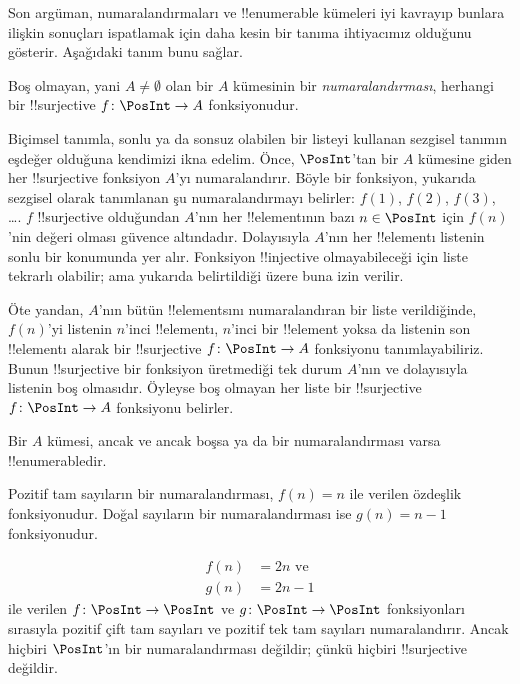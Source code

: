 Son argüman, numaralandırmaları ve !!{enumerable} kümeleri iyi kavrayıp
bunlara ilişkin sonuçları ispatlamak için daha kesin bir tanıma ihtiyacımız
olduğunu gösterir. Aşağıdaki tanım bunu sağlar.

\begin{defn}
Boş olmayan, yani $A\neq\emptyset$ olan bir $A$ kümesinin bir
\emph{numaralandırması}, herhangi bir
!!{surjective} $f \colon \PosInt \to A$ fonksiyonudur.
\end{defn}

\begin{explain}
Biçimsel tanımla, sonlu ya da sonsuz olabilen bir listeyi kullanan sezgisel
tanımın eşdeğer olduğuna kendimizi ikna edelim. Önce, $\PosInt$'tan bir $A$
kümesine giden her !!{surjective} fonksiyon $A$'yı numaralandırır. Böyle bir
fonksiyon, yukarıda sezgisel olarak tanımlanan şu numaralandırmayı belirler:
$f(1)$, $f(2)$, $f(3)$, \dots. $f$ !!{surjective} olduğundan $A$'nın her
!!{element}{}ının bazı $n \in \PosInt$ için $f(n)$'nin değeri olması güvence
altındadır. Dolayısıyla $A$'nın her !!{element}{}ı listenin sonlu bir konumunda
yer alır. Fonksiyon !!{injective} olmayabileceği için liste tekrarlı olabilir;
ama yukarıda belirtildiği üzere buna izin verilir.

Öte yandan, $A$'nın bütün !!{element}s{}ını numaralandıran bir liste
verildiğinde, $f(n)$'yi listenin $n$'inci !!{element}{}ı, $n$'inci bir
!!{element} yoksa da listenin son !!{element}{}ı alarak bir !!{surjective}
$f\colon \PosInt \to A$ fonksiyonu tanımlayabiliriz. Bunun !!{surjective} bir
fonksiyon üretmediği tek durum $A$'nın ve dolayısıyla listenin boş olmasıdır.
Öyleyse boş olmayan her liste bir !!{surjective} $f\colon \PosInt \to A$
fonksiyonu belirler.
\end{explain}

\begin{defn}
  Bir $A$ kümesi, ancak ve ancak boşsa ya da bir numaralandırması varsa
  !!{enumerable}{}dir.
\end{defn}

\begin{ex}
Pozitif tam sayıların bir numaralandırması, $f(n)=n$ ile verilen özdeşlik
fonksiyonudur. Doğal sayıların bir numaralandırması ise $g(n)=n-1$
fonksiyonudur.
\end{ex}

\begin{ex}
\begin{align*}
f(n) & = 2n \text{ ve}\\
g(n) & = 2n - 1
\end{align*}
ile verilen $f\colon \PosInt \to \PosInt$ ve $g \colon \PosInt \to
\PosInt$ fonksiyonları sırasıyla pozitif çift tam sayıları ve pozitif tek tam
sayıları numaralandırır. Ancak hiçbiri $\PosInt$'ın bir numaralandırması
değildir; çünkü hiçbiri !!{surjective} değildir.
\end{ex}

